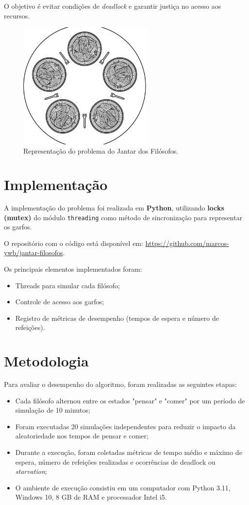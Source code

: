 \documentclass[12pt,a4paper]{article}
\begin{document}
O objetivo é evitar condições de \textit{deadlock} e garantir justiça no acesso aos recursos.  

\begin{figure}[H]
    \centering
    \includegraphics[width=0.6\textwidth]{images/jantar-filosofos.jpg}
    \caption{Representação do problema do Jantar dos Filósofos.}
\end{figure}

\section{Implementação}
A implementação do problema foi realizada em \textbf{Python}, utilizando 
\textbf{locks (mutex)} do módulo \texttt{threading} como método de 
sincronização para representar os garfos.

O repositório com o código está disponível em: \url{https://github.com/marcos-ywb/jantar-filosofos}.  

Os principais elementos implementados foram:

\begin{itemize}
    \item Threads para simular cada filósofo;
    \item Controle de acesso aos garfos;
    \item Registro de métricas de desempenho (tempos de espera e número de refeições).
\end{itemize}

\section{Metodologia}
Para avaliar o desempenho do algoritmo, foram realizadas as seguintes etapas:

\begin{itemize}
    \item Cada filósofo alternou entre os estados "pensar" e "comer" por um período de simulação de 10 minutos;
    \item Foram executadas 20 simulações independentes para reduzir o impacto da aleatoriedade nos tempos de pensar e comer;
    \item Durante a execução, foram coletadas métricas de tempo médio e máximo de espera, número de refeições realizadas e ocorrências de deadlock ou \textit{starvation};
    \item O ambiente de execução consistiu em um computador com Python 3.11, Windows 10, 8 GB de RAM e processador Intel i5.
\end{itemize}
\end{document}

